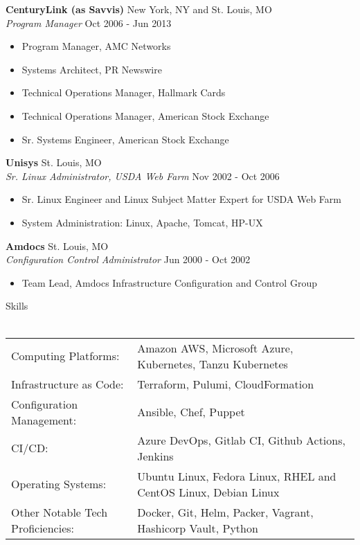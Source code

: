 \documentclass[letterpaper]{article}
\newcommand{\lineunder} {
    \vspace*{-8pt} \\
    \hspace*{-18pt} \hrulefill \\
}
\newcommand{\header} [1] {
    {\hspace*{-18pt}\vspace*{6pt} #1}
    \vspace*{-6pt} \lineunder
}
\begin{document}
\textbf{CenturyLink (as Savvis)} \hfill New York, NY and St. Louis, MO\\
\textit{Program Manager} \hfill Oct 2006 - Jun 2013\\
\vspace{-1mm}
\begin{itemize} \itemsep 1pt
	\item Program Manager, AMC Networks
	\item Systems Architect, PR Newswire
	\item Technical Operations Manager, Hallmark Cards
	\item Technical Operations Manager, American Stock Exchange
	\item Sr. Systems Engineer, American Stock Exchange
\end{itemize}
\textbf{Unisys} \hfill St. Louis, MO\\
\textit{Sr. Linux Administrator, USDA Web Farm} \hfill Nov 2002 - Oct 2006\\
\vspace{-1mm}
\begin{itemize} \itemsep 1pt
	\item Sr. Linux Engineer and Linux Subject Matter Expert for USDA Web Farm
	\item System Administration: Linux, Apache, Tomcat, HP-UX
\end{itemize}
\textbf{Amdocs} \hfill St. Louis, MO\\
\textit{Configuration Control Administrator} \hfill Jun 2000 - Oct 2002\\
\vspace{-1mm}
\begin{itemize} \itemsep 1pt
	\item Team Lead, Amdocs Infrastructure Configuration and Control Group
\end{itemize}

\header{Skills}
\begin{tabular}{ l l }
	Computing Platforms:              & Amazon AWS, Microsoft Azure, Kubernetes, Tanzu Kubernetes       \\
	Infrastructure as Code:           & Terraform, Pulumi, CloudFormation                               \\
	Configuration Management:         & Ansible, Chef, Puppet                                           \\
	CI/CD:                            & Azure DevOps, Gitlab CI, Github Actions, Jenkins                \\
	Operating Systems:                & Ubuntu Linux, Fedora Linux, RHEL and CentOS Linux, Debian Linux \\
	Other Notable Tech Proficiencies: & Docker, Git, Helm, Packer, Vagrant, Hashicorp Vault, Python     \\
\end{tabular}
\vspace{2mm}
\end{document}
